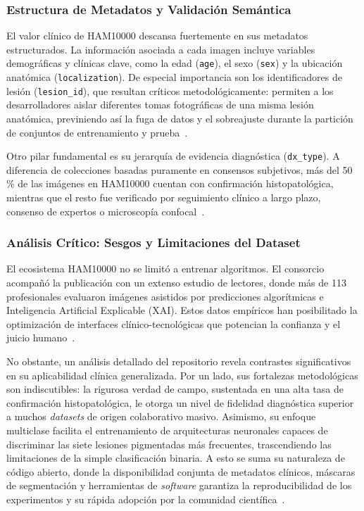\subsubsection{Estructura de Metadatos y Validación Semántica}

El valor clínico de HAM10000 descansa fuertemente en sus metadatos estructurados. La información asociada 
a cada imagen incluye variables demográficas y clínicas clave, como la edad (\texttt{age}), el sexo (\texttt{sex}) 
y la ubicación anatómica (\texttt{localization}). De especial importancia son los identificadores de 
lesión (\texttt{lesion\_id}), que resultan críticos metodológicamente: permiten a los desarrolladores 
aislar diferentes tomas fotográficas de una misma lesión anatómica, previniendo así la fuga de datos y 
el sobreajuste durante la partición de conjuntos de entrenamiento y prueba~\cite{arxiv_ham10000}.

Otro pilar fundamental es su jerarquía de evidencia diagnóstica (\texttt{dx\_type}). A diferencia de 
colecciones basadas puramente en consensos subjetivos, más del 50\,\% de las imágenes en HAM10000 cuentan 
con confirmación histopatológica, mientras que el resto fue verificado por seguimiento clínico 
a largo plazo, consenso de expertos o microscopía confocal~\cite{pmc_ham10000}.

\subsubsection{Análisis Crítico: Sesgos y Limitaciones del Dataset}

El ecosistema HAM10000 no se limitó a entrenar algoritmos. El consorcio acompañó la publicación con 
un extenso estudio de lectores, donde más de 113 profesionales evaluaron 
imágenes asistidos por predicciones algorítmicas e Inteligencia Artificial Explicable (XAI). 
Estos datos empíricos han posibilitado la optimización de interfaces clínico-tecnológicas que 
potencian la confianza y el juicio humano~\cite{figshare_ham10000_reader}. 

No obstante, un análisis detallado del repositorio revela contrastes significativos en su aplicabilidad 
clínica generalizada. Por un lado, sus fortalezas metodológicas son indiscutibles: la rigurosa verdad de 
campo, sustentada en una alta tasa de confirmación histopatológica, le otorga un nivel de fidelidad 
diagnóstica superior a muchos \textit{datasets} de origen colaborativo masivo. Asimismo, su enfoque 
multiclase facilita el entrenamiento de arquitecturas neuronales capaces de discriminar las siete 
lesiones pigmentadas más frecuentes, trascendiendo las limitaciones de la simple clasificación binaria. 
A esto se suma su naturaleza de código abierto, donde la disponibilidad conjunta de metadatos 
clínicos, máscaras de segmentación y herramientas de \textit{software} garantiza la reproducibilidad 
de los experimentos y su rápida adopción por la comunidad científica~\cite{github_ham10000_tools}.

